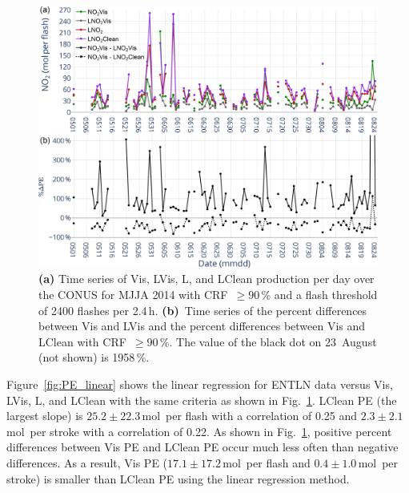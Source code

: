 \documentclass[amt]{copernicus}
\begin{document}
\begin{figure}[t]
    \includegraphics[width=12cm]{amt-2019-372-f03.png}
    \caption{\textbf{(a)} Time series of Vis, LVis, L, and LClean production per day over the CONUS for MJJA 2014 with CRF~$\geq 90$\,{\%} and a flash threshold of 2400 flashes per 2.4\,h.
    \textbf{(b)}~Time series of the percent differences between Vis and LVis and the percent differences between Vis and LClean with CRF~$\geq 90$\,{\%}.
    The value of the black dot on 23~August  (not shown) is 1958\,{\%}.}
    \label{fig:t_series}
\end{figure}

Figure~\ref{fig:PE_linear} shows the linear regression for ENTLN data versus Vis, LVis, L, and LClean with the same criteria as shown in Fig.~\ref{fig:t_series}.
LClean PE (the largest slope) is $25.2 \pm 22.3$\,mol\, per flash with a correlation of 0.25 and $2.3 \pm 2.1$\,mol\, per stroke with a correlation of 0.22.
As shown in Fig.~\ref{fig:t_series}, positive percent differences between Vis PE and LClean PE occur much less often than negative differences.
As a result, Vis PE ($17.1 \pm 17.2$\,mol\, per flash and $0.4 \pm 1.0$\,mol\, per stroke) is smaller than LClean PE using the linear regression method.
\end{document}
